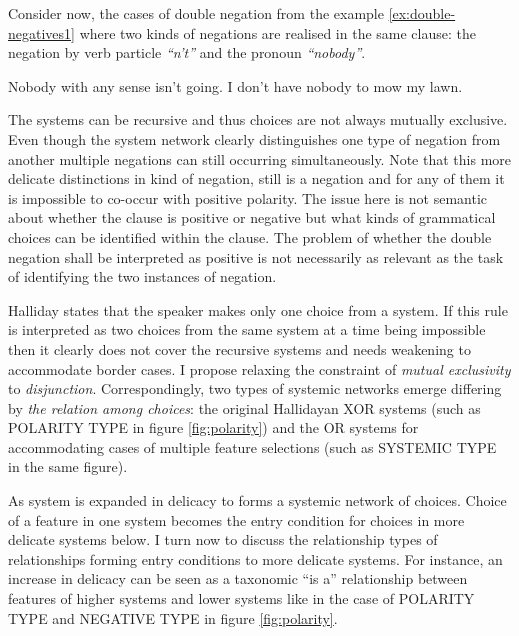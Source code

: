Consider now, the cases of double negation from the example \ref{ex:double-negatives1} where two kinds of negations are realised in the same clause: the negation by verb particle \textit{``n't''} and the pronoun \textit{``nobody''}. 

\begin{exe}
	\ex \label{ex:double-negatives1}
	Nobody with any sense isn't going. 
	\ex \label{ex:double-negatives2} I don’t have nobody to mow my lawn.
\end{exe}

The systems can be recursive and thus choices are not always mutually exclusive. Even though the system network  clearly distinguishes one type of negation from another multiple negations can still occurring simultaneously. Note that this more delicate distinctions in kind of negation, still is a negation and for any of them it is impossible to co-occur with positive polarity. 
The issue here is not semantic about whether the clause is positive or negative but what kinds of grammatical choices can be identified within the clause. The problem of whether the double negation shall be interpreted as positive is not necessarily as relevant as the task of identifying the two instances of negation. 

Halliday states that the speaker makes only one choice from a system. If this rule is interpreted as two choices from the same system at a time being impossible then it clearly does not cover the recursive systems and needs weakening to accommodate border cases. I propose relaxing the constraint of \textit{mutual exclusivity} to \textit{disjunction}. Correspondingly, two types of systemic networks emerge differing by \textit{the relation among choices}: the original Hallidayan XOR systems (such as POLARITY TYPE in figure \ref{fig:polarity}) and the OR systems for accommodating cases of multiple feature selections (such as SYSTEMIC TYPE in the same figure).

As system is expanded in delicacy to forms a systemic network of choices. Choice of a feature in one system becomes the entry condition for choices in more delicate systems below. I turn now to discuss the relationship types of relationships forming entry conditions to more delicate systems. For instance, an increase in delicacy can be seen as a taxonomic ``is a'' relationship between features of higher systems and lower systems like in the case of POLARITY TYPE and NEGATIVE TYPE in figure \ref{fig:polarity}. 


